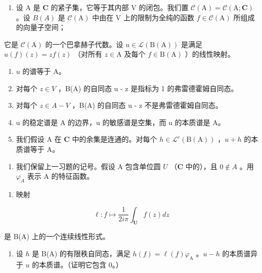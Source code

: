 \exercisesection{}

\begin{enumerate}
\def\labelenumi{\arabic{enumi})}
\tightlist
\item
  设 A 是 \(\mathbf{C}\) 的紧子集，它等于其内部 V 的闭包。我们置 \(\mathcal{C}(\mathrm{A}) = \mathcal{C}(\mathrm{A};\mathbf{C})\) 。设 \(B(A)\) 是 \(\mathcal{C}(\mathrm{A})\) 中由在 V 上的限制为全纯的函数 \(f\in \mathcal{C}(\mathrm{A})\) 所组成的向量子空间；
\end{enumerate}

它是 \(\mathcal{C}(\mathrm{A})\) 的一个巴拿赫子代数。设 \(u \in \mathcal{L}(\mathrm{B}(\mathrm{A}))\) 是满足 \(u(f)(z) = zf(z)\) （对所有 \(z \in \mathrm{A}\) 及每个 \(f \in \mathrm{B}(\mathrm{A})\) ）的线性映射。

\begin{enumerate}
\def\labelenumi{\alph{enumi})}
\item
  \(u\) 的谱等于 A。
\item
  对每个 \(z \in V\) ，B(A) 的自同态 u - z 是指标为 1 的弗雷德霍姆自同态。
\item
  对每个 \(z \in A - V\) ，B(A) 的自同态 u - z 不是弗雷德霍姆自同态。
\item
  u 的稳定谱是 A 的边界，u 的敏感谱是空集，而 u 的本质谱是 A。
\item
  我们假设 A 在 \(\mathbf{C}\) 中的余集是连通的。对每个 \(h \in \mathcal{L}^{c}(\mathrm{B}(\mathrm{A}))\) ，\(u + h\) 的本质谱等于 A。
\end{enumerate}

\begin{enumerate}
\def\labelenumi{\arabic{enumi})}
\setcounter{enumi}{1}
\tightlist
\item
  我们保留上一习题的记号。假设 A 包含单位圆 \(U\) （\(\mathbf{C}\) 中的），且 \(0 \notin A\) 。用 \(\varphi_{A}\) 表示 A 的特征函数。
\end{enumerate}

\begin{enumerate}
\def\labelenumi{\alph{enumi})}
\tightlist
\item
  映射
\end{enumerate}

\[
\ell \colon f \mapsto \frac {1}{2 i \pi} \int_ {\mathbf {U}} f (z) d z
\]

是 B(A) 上的一个连续线性形式。

\begin{enumerate}
\def\labelenumi{\alph{enumi})}
\setcounter{enumi}{1}
\tightlist
\item
  设 \(h\) 是 B(A) 的有限秩自同态，满足 \(h(f) = \ell(f)\varphi_{\mathrm{A}}\) 。\(u - h\) 的本质谱异于 \(u\) 的本质谱。（证明它包含 0。）
\end{enumerate}

